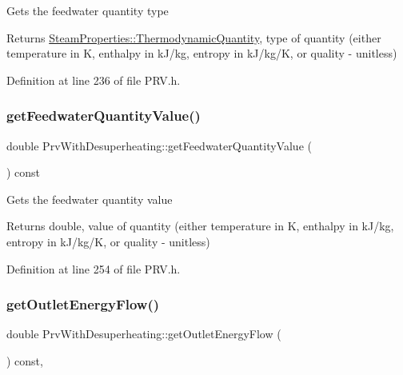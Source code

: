 Gets the feedwater quantity type

\begin{DoxyReturn}{Returns}
\hyperlink{class_steam_properties_ae0294bedf7d178c2d8fb6aed0f62fbff}{Steam\+Properties\+::\+Thermodynamic\+Quantity}, type of quantity (either temperature in K, enthalpy in k\+J/kg, entropy in k\+J/kg/K, or quality -\/ unitless) 
\end{DoxyReturn}


Definition at line 236 of file P\+R\+V.\+h.

\mbox{\label{class_prv_with_desuperheating_a8645a251b2e77e434a8bc51dfedcad69}} 
\subsubsection{\texorpdfstring{get\+Feedwater\+Quantity\+Value()}{getFeedwaterQuantityValue()}}
{\footnotesize\ttfamily double Prv\+With\+Desuperheating\+::get\+Feedwater\+Quantity\+Value (\begin{DoxyParamCaption}{ }\end{DoxyParamCaption}) const\hspace{0.3cm}{\ttfamily [inline]}}

Gets the feedwater quantity value

\begin{DoxyReturn}{Returns}
double, value of quantity (either temperature in K, enthalpy in k\+J/kg, entropy in k\+J/kg/K, or quality -\/ unitless) 
\end{DoxyReturn}


Definition at line 254 of file P\+R\+V.\+h.

\mbox{\label{class_prv_with_desuperheating_aa6e9bbb28c565ba8f7770f69ace33ab3}} 
\subsubsection{\texorpdfstring{get\+Outlet\+Energy\+Flow()}{getOutletEnergyFlow()}}
{\footnotesize\ttfamily double Prv\+With\+Desuperheating\+::get\+Outlet\+Energy\+Flow (\begin{DoxyParamCaption}{ }\end{DoxyParamCaption}) const\hspace{0.3cm}{\ttfamily [inline]}, {\ttfamily [virtual]}}

